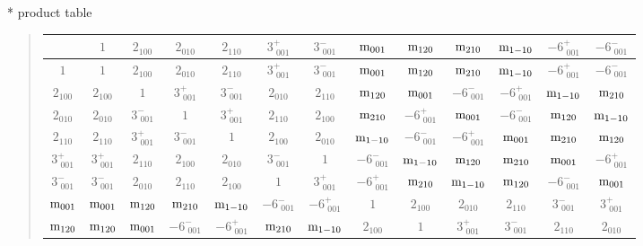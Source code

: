 \documentclass[fleqn,10pt,landscape]{jsarticle}
\begin{document}
* product table
\begin{quote}
\begin{tabular}{ccccccccccccc} \hline \hline
 & $ 1 $ & $ 2{}_{100} $ & $ 2{}_{010} $ & $ 2{}_{110} $ & $ 3^{+}_{\,\,001} $ & $ 3^{-}_{\,\,001} $ & $ {\rm m}_{001} $ & $ {\rm m}_{120} $ & $ {\rm m}_{210} $ & $ {\rm m}_{1-10} $ & $ -6^{+}_{\,\,001} $ & $ -6^{-}_{\,\,001} $ \\ \hline
$ 1 $ & $ 1 $ & $ 2{}_{100} $ & $ 2{}_{010} $ & $ 2{}_{110} $ & $ 3^{+}_{\,\,001} $ & $ 3^{-}_{\,\,001} $ & $ {\rm m}_{001} $ & $ {\rm m}_{120} $ & $ {\rm m}_{210} $ & $ {\rm m}_{1-10} $ & $ -6^{+}_{\,\,001} $ & $ -6^{-}_{\,\,001} $ \\
$ 2{}_{100} $ & $ 2{}_{100} $ & $ 1 $ & $ 3^{+}_{\,\,001} $ & $ 3^{-}_{\,\,001} $ & $ 2{}_{010} $ & $ 2{}_{110} $ & $ {\rm m}_{120} $ & $ {\rm m}_{001} $ & $ -6^{-}_{\,\,001} $ & $ -6^{+}_{\,\,001} $ & $ {\rm m}_{1-10} $ & $ {\rm m}_{210} $ \\
$ 2{}_{010} $ & $ 2{}_{010} $ & $ 3^{-}_{\,\,001} $ & $ 1 $ & $ 3^{+}_{\,\,001} $ & $ 2{}_{110} $ & $ 2{}_{100} $ & $ {\rm m}_{210} $ & $ -6^{+}_{\,\,001} $ & $ {\rm m}_{001} $ & $ -6^{-}_{\,\,001} $ & $ {\rm m}_{120} $ & $ {\rm m}_{1-10} $ \\
$ 2{}_{110} $ & $ 2{}_{110} $ & $ 3^{+}_{\,\,001} $ & $ 3^{-}_{\,\,001} $ & $ 1 $ & $ 2{}_{100} $ & $ 2{}_{010} $ & $ {\rm m}_{1-10} $ & $ -6^{-}_{\,\,001} $ & $ -6^{+}_{\,\,001} $ & $ {\rm m}_{001} $ & $ {\rm m}_{210} $ & $ {\rm m}_{120} $ \\
$ 3^{+}_{\,\,001} $ & $ 3^{+}_{\,\,001} $ & $ 2{}_{110} $ & $ 2{}_{100} $ & $ 2{}_{010} $ & $ 3^{-}_{\,\,001} $ & $ 1 $ & $ -6^{-}_{\,\,001} $ & $ {\rm m}_{1-10} $ & $ {\rm m}_{120} $ & $ {\rm m}_{210} $ & $ {\rm m}_{001} $ & $ -6^{+}_{\,\,001} $ \\
$ 3^{-}_{\,\,001} $ & $ 3^{-}_{\,\,001} $ & $ 2{}_{010} $ & $ 2{}_{110} $ & $ 2{}_{100} $ & $ 1 $ & $ 3^{+}_{\,\,001} $ & $ -6^{+}_{\,\,001} $ & $ {\rm m}_{210} $ & $ {\rm m}_{1-10} $ & $ {\rm m}_{120} $ & $ -6^{-}_{\,\,001} $ & $ {\rm m}_{001} $ \\
$ {\rm m}_{001} $ & $ {\rm m}_{001} $ & $ {\rm m}_{120} $ & $ {\rm m}_{210} $ & $ {\rm m}_{1-10} $ & $ -6^{-}_{\,\,001} $ & $ -6^{+}_{\,\,001} $ & $ 1 $ & $ 2{}_{100} $ & $ 2{}_{010} $ & $ 2{}_{110} $ & $ 3^{-}_{\,\,001} $ & $ 3^{+}_{\,\,001} $ \\
$ {\rm m}_{120} $ & $ {\rm m}_{120} $ & $ {\rm m}_{001} $ & $ -6^{-}_{\,\,001} $ & $ -6^{+}_{\,\,001} $ & $ {\rm m}_{210} $ & $ {\rm m}_{1-10} $ & $ 2{}_{100} $ & $ 1 $ & $ 3^{+}_{\,\,001} $ & $ 3^{-}_{\,\,001} $ & $ 2{}_{110} $ & $ 2{}_{010} $ \\

\end{tabular}
\end{quote}
\end{document}
